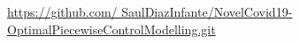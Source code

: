    \href{https://github.com/%
        SaulDiazInfante/NovelCovid19-OptimalPiecewiseControlModelling.git}{%
        https://github.com/%
        SaulDiazInfante/NovelCovid19-OptimalPiecewiseControlModelling.git}